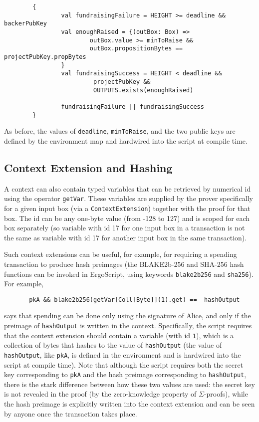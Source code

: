 \documentclass[11pt]{article}
\newcommand{\langname}{ErgoScript\xspace}
\begin{document}
\begin{verbatim}
        {
                val fundraisingFailure = HEIGHT >= deadline && backerPubKey
                val enoughRaised = {(outBox: Box) =>
                        outBox.value >= minToRaise &&
                        outBox.propositionBytes == projectPubKey.propBytes
                }
                val fundraisingSuccess = HEIGHT < deadline &&
                         projectPubKey &&
                         OUTPUTS.exists(enoughRaised)

                fundraisingFailure || fundraisingSuccess
        }
\end{verbatim}

As before, the values of \texttt{deadline}, \texttt{minToRaise}, and the two public keys are defined by the environment map and hardwired into the script at compile time.


\subsection{Context Extension and Hashing}
\label{sec:extension}
A context can also contain typed variables that can be retrieved by numerical id using the operator \texttt{getVar}. These variables are supplied by the prover specifically for a given input box (via a \texttt{ContextExtension}) together with the proof for that box. The id can be any one-byte value (from -128 to 127) and is scoped for each box separately (so variable with id 17 for one input box in a transaction is not the same as variable with id 17 for another input box in the same transaction).

Such context extensions can be useful, for example, for requiring a spending transaction to produce hash preimages (the BLAKE2b-256 and SHA-256 hash functions can be invoked in \langname, using keywords \texttt{blake2b256} and \texttt{sha256}). For example,
\begin{verbatim}
       pkA && blake2b256(getVar[Coll[Byte]](1).get) ==  hashOutput
\end{verbatim}
says that spending can be done only using the signature of Alice, and only if the preimage of \texttt{hashOutput} is written in the context. Specifically, the script requires that the context extension should contain a variable (with id \texttt{1}), which is a collection of bytes that hashes to the value of \texttt{hashOutput} (the value of \texttt{hashOutput}, like \texttt{pkA}, is defined in the environment and is hardwired into the script at compile time).  Note that although the script requires both the secret key corresponding to \texttt{pkA} and the hash preimage corresponding to \texttt{hashOutput}, there is the stark difference between how these two values are used: the secret key is not revealed in the proof (by the zero-knowledge property of $\Sigma$-proofs), while the hash preimage is explicitly written into the context extension and can be seen by anyone once the transaction takes place.
\end{document}
